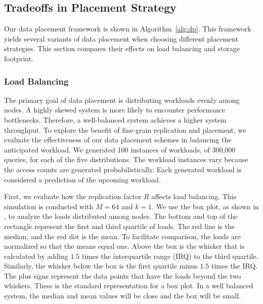 \subsection{Tradeoffs in Placement Strategy}
\label{sec:dp_tradeoff}

Our data placement framework is shown in Algorithm~\ref{alg:dp}.
This framework yields several variants of data placement
when choosing different placement strategies.
This section compares their effects on load balancing and storage footprint.

\subsubsection{Load Balancing}
The primary goal of data placement is distributing workloads evenly among nodes.
A highly skewed system is more likely to encounter performance bottlenecks.
Therefore, a well-balanced system achieves a higher system throughput.
To explore the benefit of fine-grain replication and placement, we
evaluate the effectiveness of 
our data placement schemes in balancing the anticipated workload.
We generated 100 instances of workloads, of 300,000 queries, for each of
the five distributions.
The workload instances vary because the access counts are generated
probabilistically.
Each generated workload is considered a prediction of the upcoming
workload.

First, we evaluate how the replication factor $R$ affects load balancing.
This simulation is conducted with $M=64$ and $k=1$.
We use the box plot, as shown in \myfigure{\ref{fig:simulation_imbalance_coarse}},
to analyze the loads distributed among nodes.
The bottom and top of the rectangle represent the first and third quartile of loads.
The red line is the median, and the red dot is the mean.
To facilitate comparison, the loads are normalized so that the means equal one.
Above the box is the whisker that is calculated by
adding $1.5$ times the interquartile range (IRQ) to the third quartile.
Similarly, the whisker below the box is the first quartile
minus $1.5$ times the IRQ.
The plus signs represent the data points that have the loads
beyond the two whiskers.
These is the standard representation for a box plot.
In a well balanced system, the median and mean values
will be close and the box will be small.

